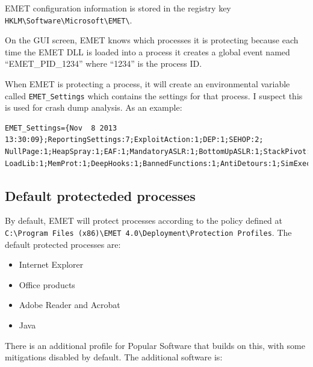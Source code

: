 \documentclass[]{article}
\begin{document}
EMET configuration information is stored in the registry key
\texttt{HKLM\textbackslash{}Software\textbackslash{}Microsoft\textbackslash{}EMET\textbackslash{}}.

On the GUI screen, EMET knows which processes it is protecting because
each time the EMET DLL is loaded into a process it creates a global
event named ``EMET\_PID\_1234'' where ``1234'' is the process ID.

When EMET is protecting a process, it will create an environmental variable called \texttt{EMET\_Settings} which contains the settings for that process.  I suspect this is used for crash dump analysis.  As an example:

\begin{verbatim}
EMET_Settings={Nov  8 2013 13:30:09};ReportingSettings:7;ExploitAction:1;DEP:1;SEHOP:2;
NullPage:1;HeapSpray:1;EAF:1;MandatoryASLR:1;BottomUpASLR:1;StackPivot:1;Caller:1;
LoadLib:1;MemProt:1;DeepHooks:1;BannedFunctions:1;AntiDetours:1;SimExecFlow:1=15
\end{verbatim}


\subsection{Default protecteded processes}\label{default-process-protected}

By default, EMET will protect processes according to the policy defined at
\texttt{C:\textbackslash{}Program Files (x86)\textbackslash{}EMET 4.0\textbackslash{}Deployment\textbackslash{}Protection Profiles}.
The default protected processes are:

\begin{itemize}
\item
  Internet Explorer
\item
  Office products
\item
  Adobe Reader and Acrobat
\item
  Java
\end{itemize}

There is an additional profile for Popular Software that builds on this,
with some mitigations disabled by default. The additional software is:
\end{document}
